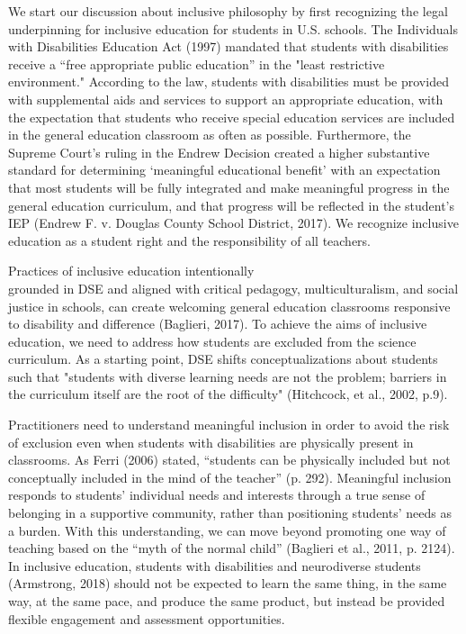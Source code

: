 \documentclass[11.5pt]{sig-alternate}
\begin{document}
\begin{large}
 We start our discussion about inclusive philosophy by first recognizing the legal underpinning for inclusive education for students in U.S. schools. The Individuals with Disabilities Education Act (1997) mandated that students with disabilities receive a “free appropriate public education” in the "least restrictive environment." According to the law, students with disabilities must be provided with supplemental aids and services to support an appropriate education, with the expectation that students who receive special education services are included in the general education classroom as often as possible. Furthermore, the Supreme Court’s ruling in the Endrew Decision created a higher substantive standard for determining ‘meaningful educational benefit’ with an expectation that most students will be fully integrated and make meaningful progress in the general education curriculum, and that progress will be reflected in the student’s IEP (Endrew F. v. Douglas County School District, 2017). We recognize inclusive education as a student right and the responsibility of all teachers.
	
 Practices of inclusive education intentionally \\grounded in DSE and aligned with critical pedagogy, multiculturalism, and social justice in schools, can create welcoming general education classrooms responsive to disability and difference (Baglieri, 2017). To achieve the aims of inclusive education, we need to address how students are excluded from the science curriculum. As a starting point, DSE shifts conceptualizations about students such that "students with diverse learning needs are not the problem; barriers in the curriculum itself are the root of the difficulty" (Hitchcock, et al., 2002, p.9).

Practitioners need to understand meaningful inclusion in order to avoid the risk of exclusion even when students with disabilities are physically present in classrooms. As Ferri (2006) stated, “students can be physically included but not conceptually included in the mind of the teacher” (p. 292). Meaningful inclusion responds to students’ individual needs and interests through a true sense of belonging in a supportive community, rather than positioning students’ needs as a burden. With this understanding, we can move beyond promoting one way of teaching based on the “myth of the normal child” (Baglieri et al., 2011, p. 2124). In inclusive education, students with disabilities and neurodiverse students (Armstrong, 2018) should not be expected to learn the same thing, in the same way, at the same pace, and produce the same product, but instead be provided flexible engagement and assessment opportunities.


\end{large}
\end{document}
